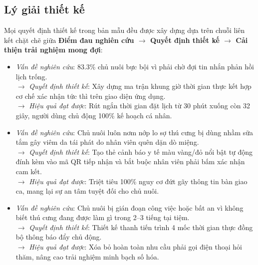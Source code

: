 \subsection{Lý giải thiết kế}
Mọi quyết định thiết kế trong bản mẫu đều được xây dựng dựa trên chuỗi liên kết chặt chẽ giữa \textbf{Điểm đau nghiên cứu $\rightarrow$ Quyết định thiết kế $\rightarrow$ Cải thiện trải nghiệm mong đợi}:
\begin{itemize}
    \item \textit{Vấn đề nghiên cứu}: 83.3\% chủ nuôi bực bội vì phải chờ đợi tin nhắn phản hồi lịch trống. \\
    $\rightarrow$ \textit{Quyết định thiết kế}: Xây dựng ma trận khung giờ thời gian thực kết hợp cơ chế xác nhận tức thì trên giao diện ứng dụng. \\
    $\rightarrow$ \textit{Hiệu quả đạt được}: Rút ngắn thời gian đặt lịch từ 30 phút xuống còn 32 giây, người dùng chủ động 100\% kế hoạch cá nhân.
    \item \textit{Vấn đề nghiên cứu}: Chủ nuôi luôn nơm nớp lo sợ thú cưng bị dùng nhầm sữa tắm gây viêm da tái phát do nhân viên quên dặn dò miệng. \\
    $\rightarrow$ \textit{Quyết định thiết kế}: Tạo thẻ cảnh báo y tế màu vàng/đỏ nổi bật tự động đính kèm vào mã QR tiếp nhận và bắt buộc nhân viên phải bấm xác nhận cam kết. \\
    $\rightarrow$ \textit{Hiệu quả đạt được}: Triệt tiêu 100\% nguy cơ đứt gãy thông tin bàn giao ca, mang lại sự an tâm tuyệt đối cho chủ nuôi.
    \item \textit{Vấn đề nghiên cứu}: Chủ nuôi bị gián đoạn công việc hoặc bất an vì không biết thú cưng đang được làm gì trong 2--3 tiếng tại tiệm. \\
    $\rightarrow$ \textit{Quyết định thiết kế}: Thiết kế thanh tiến trình 4 mốc thời gian thực đồng bộ thông báo đẩy chủ động. \\
    $\rightarrow$ \textit{Hiệu quả đạt được}: Xóa bỏ hoàn toàn nhu cầu phải gọi điện thoại hỏi thăm, nâng cao trải nghiệm minh bạch số hóa.
\end{itemize}
